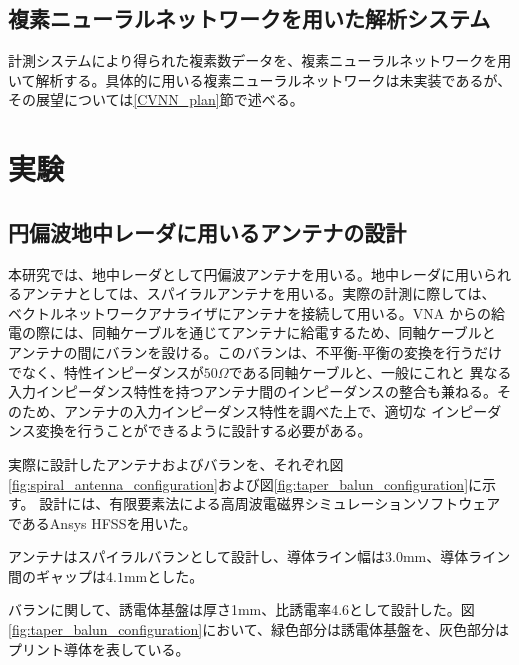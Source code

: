 \documentclass[11pt,a4paper,uplatex,draft]{ujarticle}
\begin{document}
  \newpage

  \subsection{複素ニューラルネットワークを用いた解析システム}

    計測システムにより得られた複素数データを、複素ニューラルネットワークを用いて解析する。具体的に用いる複素ニューラルネットワークは未実装であるが、
    その展望については\ref{CVNN_plan}節で述べる。

\section{実験}

  \subsection{円偏波地中レーダに用いるアンテナの設計}

  本研究では、地中レーダとして円偏波アンテナを用いる。地中レーダに用いられるアンテナとしては、スパイラルアンテナを用いる。実際の計測に際しては、
  ベクトルネットワークアナライザにアンテナを接続して用いる。VNA からの給電の際には、同軸ケーブルを通じてアンテナに給電するため、同軸ケーブルと
  アンテナの間にバランを設ける。このバランは、不平衡-平衡の変換を行うだけでなく、特性インピーダンスが$50\Omega$である同軸ケーブルと、一般にこれと
  異なる入力インピーダンス特性を持つアンテナ間のインピーダンスの整合も兼ねる。そのため、アンテナの入力インピーダンス特性を調べた上で、適切な
  インピーダンス変換を行うことができるように設計する必要がある。

  実際に設計したアンテナおよびバランを、それぞれ図\ref{fig:spiral_antenna_configuration}および図\ref{fig:taper_balun_configuration}に示す。
  設計には、有限要素法による高周波電磁界シミュレーションソフトウェアであるAnsys HFSSを用いた。

  アンテナはスパイラルバランとして設計し、導体ライン幅は$3.0\mathrm{mm}$、導体ライン間のギャップは$4.1\mathrm{mm}$とした。
  
  バランに関して、誘電体基盤は厚さ1mm、比誘電率4.6として設計した。図\ref{fig:taper_balun_configuration}において、緑色部分は誘電体基盤を、灰色部分は
  プリント導体を表している。
\end{document}
